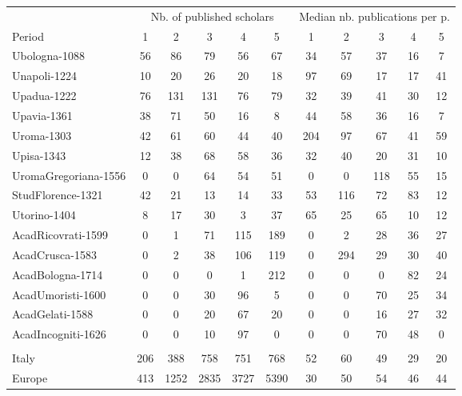 \documentclass[12pt]{article}
\begin{document}
		\begin{tabular}{@{ \extracolsep{1pt}}lcccccccccc}
			\hline
			\hline
			& \multicolumn{5}{c}{Nb. of published scholars}  & \multicolumn{5}{c}{ Median nb. publications per p.}\\
			Period   & 1 &2 & 3 & 4 & 5  & 1 &2 & 3 & 4 & 5\\
			\hline
Ubologna-1088 & 56       & 86       & 79       & 56       & 67       & 34       & 57       & 37       & 16       & 7 \\
Unapoli-1224 & 10       & 20       & 26       & 20       & 18       & 97       & 69       & 17       & 17       & 41 \\
Upadua-1222 & 76       & 131      & 131      & 76       & 79       & 32       & 39       & 41       & 30       & 12 \\
Upavia-1361 & 38       & 71       & 50       & 16       & 8        & 44       & 58       & 36       & 16       & 7 \\
Uroma-1303 & 42       & 61       & 60       & 44       & 40       & 204      & 97       & 67       & 41       & 59 \\
Upisa-1343 & 12       & 38       & 68       & 58       & 36       & 32       & 40       & 20       & 31       & 10 \\
UromaGregoriana-1556 & 0        & 0        & 64       & 54       & 51       & 0        & 0        & 118      & 55       & 15 \\
StudFlorence-1321 & 42       & 21       & 13       & 14       & 33       & 53       & 116      & 72       & 83       & 12 \\
Utorino-1404 & 8        & 17       & 30       & 3        & 37       & 65       & 25       & 65       & 10       & 12 \\
AcadRicovrati-1599 & 0        & 1        & 71       & 115      & 189      & 0        & 2        & 28       & 36       & 27 \\
AcadCrusca-1583 & 0        & 2        & 38       & 106      & 119      & 0        & 294      & 29       & 30       & 40 \\
AcadBologna-1714 & 0        & 0        & 0        & 1        & 212      & 0        & 0        & 0        & 82       & 24 \\
AcadUmoristi-1600 & 0        & 0        & 30       & 96       & 5        & 0        & 0        & 70       & 25       & 34 \\
AcadGelati-1588 & 0        & 0        & 20       & 67       & 20       & 0        & 0        & 16       & 27       & 32 \\
AcadIncogniti-1626 & 0        & 0        & 10       & 97       & 0        & 0        & 0        & 70       & 48       & 0 \\
\\
Italy    & 206      & 388      & 758      & 751      & 768      & 52       & 60       & 49       & 29       & 20 \\
Europe   & 413      & 1252     & 2835     & 3727     & 5390     & 30       & 50       & 54       & 46       & 44 \\
			\hline
			\hline
	\end{tabular}
\end{document}
